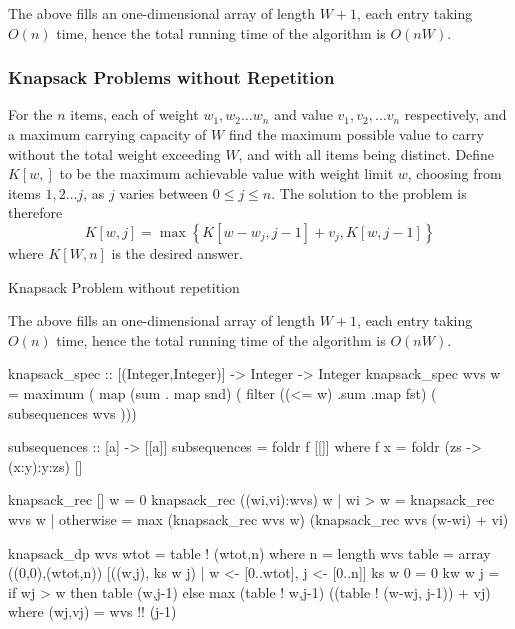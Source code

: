 \documentclass[10pt]{article}
\begin{document}
The above fills an one-dimensional array of length $W+1$, each entry taking $O(n)$ time, hence the total running time of the algorithm is $O(nW)$.
\subsubsection{Knapsack Problems without Repetition}
For the $n$ items, each of weight $w_1,w_2\ldots w_n$ and value $v_1,v_2, \ldots v_n$ respectively, and a maximum carrying capacity of $W$ find the maximum possible value to carry without the total weight exceeding $W$, and with all items being distinct.
Define $K[w,]$ to be the maximum achievable value with weight limit $w$, choosing from items $1,2\ldots j$, as $j$ varies between $0\le j \le n$.  The solution to the problem is therefore \[K[w,j] = \max\left\{K[w-w_j,j-1]+v_j, K[w,j-1]\right\}\]where $K[W,n]$ is the desired answer.
\begin{algorithm}
\caption{Knapsack Problem without repetition}
\;
\end{algorithm}

The above fills an one-dimensional array of length $W+1$, each entry taking $O(n)$ time, hence the total running time of the algorithm is $O(nW)$.
\begin{code}
knapsack_spec :: [(Integer,Integer)] -> Integer -> Integer
knapsack_spec wvs w = 
      maximum ( map (sum . map snd) (
      filter ((<= w) .sum .map fst) (
      subsequences wvs )))

subsequences :: [a] -> [[a]] 
subsequences = foldr f [[]] 
  where f x = foldr (\y zs -> (x:y):y:zs) []

knapsack_rec [] w = 0
knapsack_rec ((wi,vi):wvs) w
  | wi > w = knapsack_rec wvs w
  | otherwise = max (knapsack_rec wvs w) (knapsack_rec wvs (w-wi) + vi)

knapsack_dp wvs wtot = table ! (wtot,n)
  where n = length wvs
        table = array ((0,0),(wtot,n)) [((w,j), ks w j) | w <- [0..wtot], j <- [0..n]]
        ks w 0 = 0
        kw w j = if wj > w then table (w,j-1)
                 else max (table ! w,j-1)
                   ((table ! (w-wj, j-1)) + vj)
          where (wj,vj) = wvs !! (j-1)
\end{code}
\end{document}
